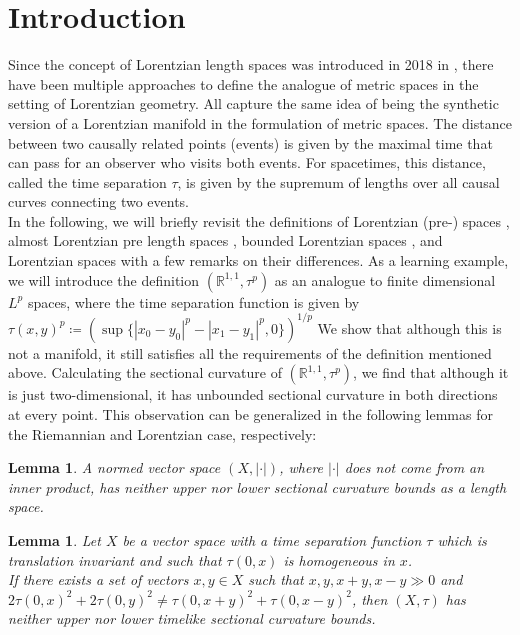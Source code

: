 \documentclass[11pt, a4paper]{article} %
\newcommand{\R}{\mathbb{R}} %
\newtheorem{lemma}[definition]{Lemma}
\theoremstyle{plain} %
\newcommand{\mDef}{\coloneqq }
\begin{document}
\section{Introduction}
Since the concept of Lorentzian length spaces was introduced in 2018 in \cite{kunzinger2018lorentz}, there have been multiple approaches to define the analogue of metric spaces in the setting of Lorentzian geometry. All capture the same idea of being the synthetic version of a Lorentzian manifold in the formulation of metric spaces. The distance between two causally related points (events) is given by the maximal time that can pass for an observer who visits both events. For spacetimes, this distance, called the time separation $\tau$, is given by the supremum of lengths over all causal curves connecting two events. \\
In the following, we will briefly revisit the definitions of Lorentzian (pre-) spaces \cite{kunzinger2018lorentz}, almost Lorentzian pre length spaces \cite{muller2019lorentzianGromovHausdorfAndFiniteness}, bounded Lorentzian spaces \cite{minguzzi2022lorentzian}, and Lorentzian spaces \cite{muller2024maximality} with a few remarks on their differences.
As a learning example, we will introduce the definition $(\R^{1,1},\tau^p)$ as an analogue to finite dimensional $L^p$ spaces, where the time separation function is given by $\tau(x,y)^p \mDef \left(\sup\{|x_0-y_0|^p - |x_1-y_1|^p,0\} \right)^{1/p}$ We show that although this is not a manifold, it still satisfies all the requirements of the definition mentioned above.
Calculating the sectional curvature of $(\R^{1,1},\tau^p)$, we find that although it is just two-dimensional, it has unbounded sectional curvature in both directions at every point.
This observation can be generalized in the following lemmas for the Riemannian and Lorentzian case, respectively:
\begin{lemma}
\label{lemParRm}
A normed vector space $(X,|\cdot|)$, where $|\cdot|$ does not come from an inner product, has neither upper nor lower sectional curvature bounds as a length space.
\end{lemma}
\begin{lemma}
\label{Lem_LorUnb}
Let $X$ be a vector space with a time separation function $\tau$ which is translation invariant and such that $\tau(0,x)$ is homogeneous in $x$.\\
If there exists a set of vectors $x,y\in X$ such that $x,y,x+y,x-y\gg 0$ and \\
$2 \tau(0,x)^2 + 2 \tau(0,y)^2 \neq \tau(0,x+y)^2 + \tau(0,x-y)^2$, then $(X,\tau)$ has neither upper nor lower timelike sectional curvature bounds.
\end{lemma}
\end{document}
